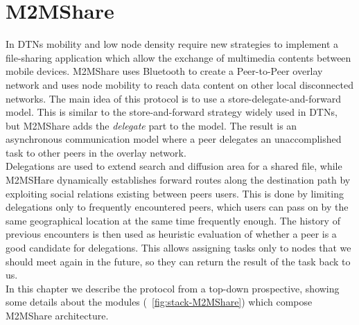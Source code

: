 
\chapter{M2MShare}\label{m2mshare} %





In DTNs mobility and low node density require new strategies to implement a file-sharing application which allow the exchange of multimedia contents between mobile devices. M2MShare \cite{tesiarmir} uses Bluetooth to create a Peer-to-Peer overlay network and uses node mobility to reach data content on other local disconnected networks. The main idea of this protocol is to use a store-delegate-and-forward model. This is similar to the store-and-forward strategy widely used in DTNs, but M2MShare adds the \textit{delegate} part to the model. The result is an asynchronous communication model where a peer delegates an unaccomplished task to other peers in the overlay network.
\\

Delegations are used to extend search and diffusion area for a shared file, while M2MSHare dynamically establishes forward routes along the destination path by exploiting social relations existing between peers users. This is done by limiting delegations only to frequently encountered peers, which users can pass on by the same geographical location at the same time frequently enough. The history of previous encounters is then used as heuristic evaluation of whether a peer is a good candidate for delegations. This allows assigning tasks only to nodes that we should meet again in the future, so they can return the result of the task back to us.
\\

In this chapter we describe the protocol from a top-down prospective, showing some details about the modules (\figurename~\ref{fig:stack-M2MShare}) which compose M2MShare architecture. 

